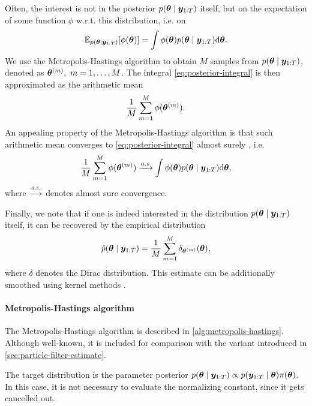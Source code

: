 Often, the interest is not in the posterior $p(\bm{\theta} \mid \bm{y}_{1:T})$ itself, but on the expectation of some function $\phi$ w.r.t. this distribution, i.e. on
\begin{equation} \label{eq:posterior-integral}
\mathbb{E}_{p(\bm{\theta} \mid \bm{y}_{1:T})}[\phi(\bm{\theta})] = \int \phi(\bm{\theta}) p(\bm{\theta} \mid \bm{y}_{1:T}) \mathrm{d}{\bm{\theta}}.
\end{equation}
We use the Metropolis-Hastings algorithm \citep{metropolis, hastings} to obtain $M$ samples from $p(\bm{\theta} \mid \bm{y}_{1:T})$, denoted as $\bm{\theta}^{(m)},\ m = 1, \ldots, M$. The integral \eqref{eq:posterior-integral} is then approximated as the arithmetic mean
\begin{equation*}
\frac{1}{M} \sum_{m=1}^M \phi(\bm{\theta}^{(m)}).
\end{equation*}
An appealing property of the Metropolis-Hastings algorithm is that such arithmetic mean converges to \eqref{eq:posterior-integral} almost surely \citep{robert-casella}, i.e.
\begin{equation*}
\frac{1}{M} \sum_{m=1}^M \phi(\bm{\theta}^{(m)}) \xrightarrow{a.s} \int \phi(\bm{\theta}) p(\bm{\theta} \mid \bm{y}_{1:T}) \mathrm{d}{\bm{\theta}},
\end{equation*}
where $\xrightarrow{a.s.}$ denotes almost sure convergence.

Finally, we note that if one is indeed interested in the distribution $p(\bm{\theta} \mid \bm{y}_{1:T})$ itself, it can be recovered by the empirical distribution
\begin{equation*}
\hat{p}(\bm{\theta} \mid \bm{y}_{1:T}) = \frac{1}{M} \sum_{m=1}^M \delta_{\bm{\theta}^{(m)}}(\bm{\theta}),
\end{equation*}
where $\delta$ denotes the Dirac distribution. This estimate can be additionally smoothed using kernel methods \citep{kernel-smoothing}.


\paragraph{Metropolis-Hastings algorithm}
The Metropolis-Hastings algorithm is described in \autoref{alg:metropolis-hastings}. Although well-known, it is included for comparison with the variant introduced in \autoref{sec:particle-filter-estimate}.

The target distribution is the parameter posterior $p(\bm{\theta} \mid \bm{y}_{1:T}) \propto p(\bm{y}_{1:T} \mid \bm{\theta}) \pi(\bm{\theta})$. In this case, it is not necessary to evaluate the normalizing constant, since it gets cancelled out.

